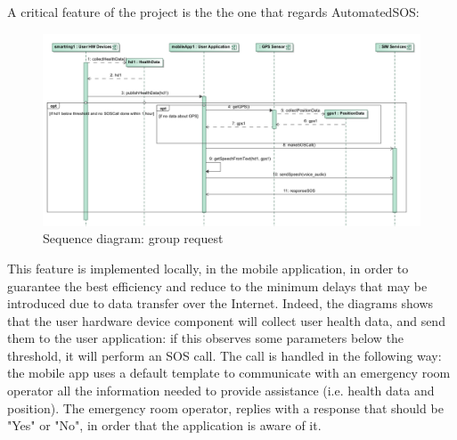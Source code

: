 \par 
A critical feature of the project is the the one that regards AutomatedSOS: 

\begin{figure}[H]
\includegraphics[width=\linewidth]{Images/automatedsos.pdf}
\caption{ Sequence diagram: group request }
\label{fig:world2}
\end{figure}

This feature is implemented locally, in the mobile application, in order to guarantee the best efficiency and reduce to the minimum delays
that may be introduced due to data transfer over the Internet. Indeed, the diagrams shows that the user hardware device component will collect
user health data, and send them to the user application: if this observes some parameters below the threshold, it will perform an SOS
call. The call is handled in the following way: the mobile app uses a default template to communicate with an emergency room operator all the
information needed to provide assistance (i.e. health data and position). The emergency room operator, replies with a response that should be "Yes" or "No", in order that the application is aware of it. 
